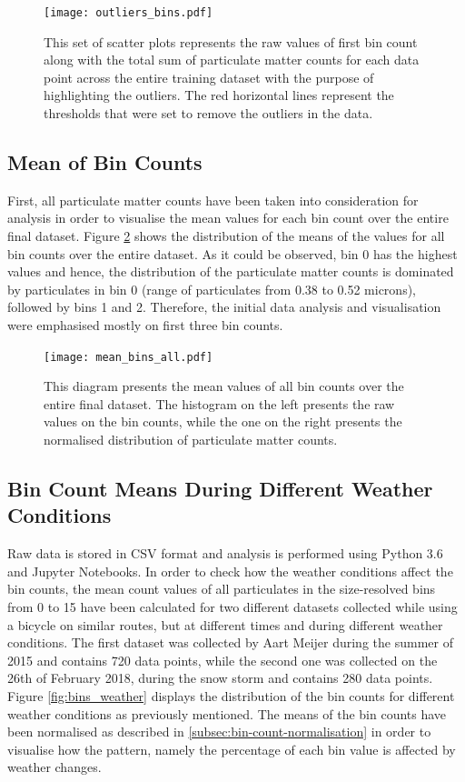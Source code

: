 \documentclass[bsc,frontabs,twoside,singlespacing, parskip,deptreport]{infthesis}     %
\begin{document}
\begin{figure}[h!]
  \center
  \texttt{[image: outliers\_bins.pdf]}
  \caption{This set of scatter plots represents the raw values of first bin count along with the total sum of particulate matter counts for each data point across the entire training dataset with the purpose of highlighting the outliers. The red horizontal lines represent the thresholds that were set to remove the outliers in the data.}
  \label{fig:outliers-bins}
\end{figure}


\subsection{Mean of Bin Counts}
\label{subsec:bin-count-means}

First, all particulate matter counts have been taken into consideration for analysis in order to visualise the mean values for each bin count over the entire final dataset. Figure \ref{fig:mean_bins_all} shows the distribution of the means of the values for all bin counts over the entire dataset. As it could be observed, bin 0 has the highest values and hence, the distribution of the particulate matter counts is dominated by particulates in bin 0 (range of particulates from 0.38 to 0.52 microns), followed by bins 1 and 2. Therefore, the initial data analysis and visualisation were emphasised mostly on first three bin counts.

\begin{figure}[h!]
  \center
  \texttt{[image: mean\_bins\_all.pdf]}
  \caption{This diagram presents the mean values of all bin counts over the entire final dataset. The histogram on the left presents the raw values on the bin counts, while the one on the right presents the normalised distribution of particulate matter counts.}
  \label{fig:mean_bins_all}
\end{figure}


\subsection{Bin Count Means During Different Weather Conditions}
\label{subsec:different-weather}

Raw data is stored in CSV format and analysis is performed using Python 3.6 and Jupyter Notebooks. In order to check how the weather conditions affect the bin counts, the mean count values of all particulates in the size-resolved bins from 0 to 15 have been calculated for two different datasets collected while using a bicycle on similar routes, but at different times and during different weather conditions. The first dataset was collected by Aart Meijer during the summer of 2015 and contains 720 data points, while the second one was collected on the 26th of February 2018, during the snow storm and contains 280 data points. Figure \ref{fig:bins_weather} displays the distribution of the bin counts for different weather conditions as previously mentioned. The means of the bin counts have been normalised as described in \ref{subsec:bin-count-normalisation} in order to visualise how the pattern, namely the percentage of each bin value is affected by weather changes.
\end{document}
